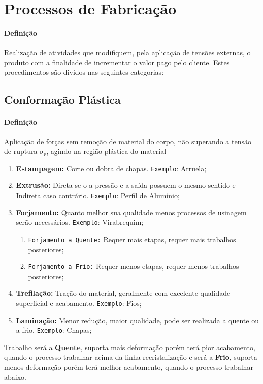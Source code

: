 \documentclass{article}
\begin{document}
    \section{Processos de Fabricação}
        \paragraph{Definição}Realização de atividades que modifiquem, pela aplicação de tensões externas, o produto com a finalidade de incrementar o valor pago pelo cliente. Estes procedimentos são dividos nas seguintes categorias:

        \subsection{Conformação Plástica}
            \paragraph{Definição}Aplicação de forças sem remoção de material do corpo, não superando a tensão de ruptura $\sigma_{r}$, agindo na região plástica do material
                \begin{enumerate}[rightmargin = \leftmargin]
                    \item \textbf{Estampagem:} Corte ou dobra de chapas. \texttt{Exemplo}: Arruela;

                    \item \textbf{Extrusão:} Direta se o a pressão e a saída possuem o mesmo sentido e Indireta caso contrário. \texttt{Exemplo}: Perfil de Alumínio;

                    \item \textbf{Forjamento:} Quanto melhor sua qualidade menos processos de usinagem serão necessários. \texttt{Exemplo}: Virabrequim;
                        \begin{enumerate}[rightmargin = \leftmargin, noitemsep]
                            \item \texttt{Forjamento a Quente:} Requer mais etapas, requer mais trabalhos posteriores;
                            \item \texttt{Forjamento a Frio:} Requer menos etapas, requer menos trabalhos posteriores;
                        \end{enumerate}

                    \item \textbf{Trefilação:} Tração do material, geralmente com excelente qualidade superficial e acabamento. \texttt{Exemplo}: Fios;

                    \item \textbf{Laminação:} Menor redução, maior qualidade, pode ser realizada a quente ou a frio. \texttt{Exemplo}: Chapas;
                \end{enumerate}
            Trabalho será a \textbf{Quente}, suporta mais deformação porém terá pior acabamento, quando o processo trabalhar acima da linha recristalização e será a \textbf{Frio}, suporta menos deformação porém terá melhor acabamento, quando o processo trabalhar abaixo.
\end{document}
